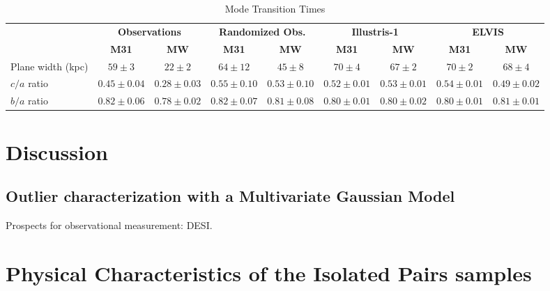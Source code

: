 \documentclass[a4paper,fleqn,usenatbib]{mnras}
\begin{document}
\begin{table}
  \centering
  \renewcommand{\arraystretch}{1.2}
  \begin{tabular}{|p{2.5cm}|c|c|c|c|c|c|c|c|}
    \hline
    \multirow{2}{4.0cm}{} & \multicolumn{2}{c|}{\textbf{Observations}} & \multicolumn{2}{c|}{\textbf{Randomized Obs.}} & \multicolumn{2}{c|}{\textbf{Illustris-1}} & \multicolumn{2}{c|}{\textbf{ELVIS}}\\
    \cline{2-9}
    & \textbf{M31} & \textbf{MW} & \textbf{M31} & \textbf{MW} & \textbf{M31} & \textbf{MW}& \textbf{M31} & \textbf{MW}\\
    \hline
    Plane width (kpc) & $59\pm 3$  & $22\pm 2$  & $64\pm 12$   & $45\pm 8$     & $70\pm 4$ & $67\pm 2$ & $70\pm 2$& $68\pm 4$ \\\hline
    $c/a$ ratio & $0.45\pm 0.04$ & $0.28\pm 0.03$ & $0.55\pm0.10$ & $0.53\pm 0.10$ & $0.52\pm 0.01$ & $0.53\pm 0.01$ & $0.54\pm 0.01$& $0.49\pm 0.02$ \\ \hline
    $b/a$ ratio & $0.82\pm 0.06$ & $0.78\pm 0.02$ & $0.82\pm0.07$ & $0.81\pm 0.08$ & $0.80\pm 0.01$ & $0.80\pm 0.02$ & $0.80\pm0.01$& $0.81\pm 0.01$\\ \hline
  \end{tabular}
  \caption{Mode Transition Times}
\end{table}

\section{Discussion}



\subsection{Outlier characterization with a Multivariate Gaussian Model}


Prospects for observational measurement: DESI.






\newpage
\appendix

\section{Physical Characteristics of the Isolated Pairs samples}
\end{document}

